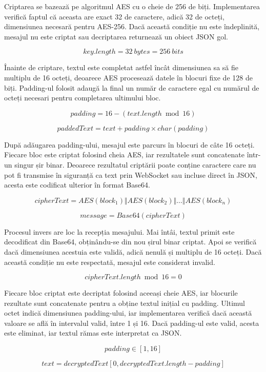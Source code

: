 Criptarea se bazează pe algoritmul AES cu o cheie de 256 de biți. Implementarea verifică faptul că aceasta are exact 32 de caractere, adică 32 de octeți, dimensiunea necesară pentru AES-256. Dacă această condiție nu este îndeplinită, mesajul nu este criptat sau decriptarea returnează un obiect JSON gol.

\[
    key.length = 32 \ bytes = 256 \ bits
\]

Înainte de criptare, textul este completat astfel încât dimensiunea sa să fie multiplu de 16 octeți, deoarece AES procesează datele în blocuri fixe de 128 de biți. Padding-ul folosit adaugă la final un număr de caractere egal cu numărul de octeți necesari pentru completarea ultimului bloc.

\[
    padding = 16 - (text.length \bmod 16)
\]

\[
    paddedText = text + padding \times char(padding)
\]

După adăugarea padding-ului, mesajul este parcurs în blocuri de câte 16 octeți. Fiecare bloc este criptat folosind cheia AES, iar rezultatele sunt concatenate într-un singur șir binar. Deoarece rezultatul criptării poate conține caractere care nu pot fi transmise în siguranță ca text prin WebSocket sau incluse direct în JSON, acesta este codificat ulterior în format Base64.

\[
    cipherText = AES(block_1) \Vert AES(block_2) \Vert \ldots \Vert AES(block_n)
\]

\[
    message = Base64(cipherText)
\]

Procesul invers are loc la recepția mesajului. Mai întâi, textul primit este decodificat din Base64, obținându-se din nou șirul binar criptat. Apoi se verifică dacă dimensiunea acestuia este validă, adică nenulă și multiplu de 16 octeți. Dacă această condiție nu este respectată, mesajul este considerat invalid.

\[
    cipherText.length \bmod 16 = 0
\]

Fiecare bloc criptat este decriptat folosind aceeași cheie AES, iar blocurile rezultate sunt concatenate pentru a obține textul inițial cu padding. Ultimul octet indică dimensiunea padding-ului, iar implementarea verifică dacă această valoare se află în intervalul valid, între 1 și 16. Dacă padding-ul este valid, acesta este eliminat, iar textul rămas este interpretat ca JSON.

\[
    padding \in [1, 16]
\]

\[
    text = decryptedText[0, decryptedText.length - padding]
\]

